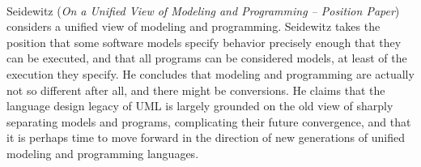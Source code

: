 

\ \hline \ %

Seidewitz
\cite{isola-2016-seidewitz}
({\em On a Unified View of Modeling and Programming -- Position Paper})
considers a unified view of modeling and programming. 
Seidewitz takes the position that some software models specify behavior precisely enough that they can be executed, and that all programs can be considered models, at least of the execution they specify. He concludes that modeling and programming are actually not so different after all, and there might be conversions.  He claims that the language design legacy of UML is largely grounded on the old view of sharply separating models and programs, complicating their future convergence, and that it is perhaps time to move forward in the direction of new generations of unified modeling and programming languages.

\done{}